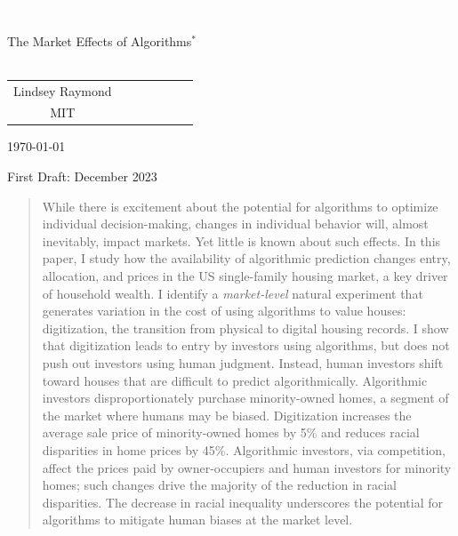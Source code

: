 \documentclass[11pt]{article}
\begin{document}
\thispagestyle{empty}


\vspace{20pt}
\begin{center}
\textcolor{white}{fill}\\
\vspace{20pt}


\LARGE{The Market Effects of Algorithms$^{*}$}\\\mbox{ }
\end{center}


\begin{singlespace}
\begin{center}
\begin{tabular}{ccccccc}
\large{Lindsey Raymond} \\
\large{MIT} \\
\end{tabular}
\end{center}

\end{singlespace}


\begin{center}
\vspace{.20in}
\normalsize{\today}

\vspace{10pt}
First Draft: December 2023\\
\end{center}
\vspace{10pt}


\begin{abstract}
\vspace{-11pt}
\singlespacing
\noindent

 
While there is excitement about the potential for algorithms to optimize individual decision-making, changes in individual behavior will, almost inevitably, impact markets. Yet little is known about such effects. In this paper, I study how the availability of algorithmic prediction changes entry, allocation, and prices in the US single-family housing market, a key driver of household wealth. I identify a \textit{market-level} natural experiment that generates variation in the cost of using algorithms to value houses: digitization, the transition from physical to digital housing records. I show that digitization leads to entry by investors using algorithms, but does not push out investors using human judgment. Instead, human investors shift toward houses that are difficult to predict algorithmically. Algorithmic investors disproportionately purchase minority-owned homes, a segment of the market where humans may be biased. Digitization increases the average sale price of minority-owned homes by 5\% and reduces racial disparities in home prices by 45\%. Algorithmic investors, via competition, affect the prices paid by owner-occupiers and human investors for minority homes; such changes drive the majority of the reduction in racial disparities. The decrease in racial inequality underscores the potential for algorithms to mitigate human biases at the market level.
\end{abstract}
\end{document}

